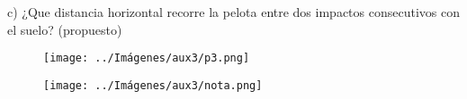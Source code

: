 \documentclass[letterpaper,11pt]{article}
\begin{document}
\begin{enumerate}
c) ¿Que distancia horizontal recorre la pelota entre dos impactos consecutivos con el suelo? (propuesto) \\
    
      \begin{figure}[h!]
        \centering
        \texttt{[image: ../Imágenes/aux3/p3.png]}
    \end{figure} 
    
       \begin{figure}[h!]
        \centering
        \texttt{[image: ../Imágenes/aux3/nota.png]}
    \end{figure} 


\end{enumerate}
\end{document}
